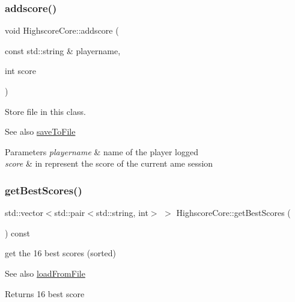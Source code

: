 \subsubsection{\texorpdfstring{addscore()}{addscore()}}
{\footnotesize\ttfamily void Highscore\+Core\+::addscore (\begin{DoxyParamCaption}\item[{const std\+::string \&}]{playername,  }\item[{int}]{score }\end{DoxyParamCaption})\hspace{0.3cm}{\ttfamily [inline]}}



Store file in this class. 

\begin{DoxySeeAlso}{See also}
\hyperlink{class_highscore_core_a7a86c95f26a7b0d527f639f94bf96301}{save\+To\+File} 
\end{DoxySeeAlso}

\begin{DoxyParams}{Parameters}
{\em playername} & name of the player logged \\
\hline
{\em score} & in represent the score of the current ame session \\
\hline
\end{DoxyParams}
\mbox{\label{class_highscore_core_a8d80890801631184899061cdd3e5dcbe}} 
\subsubsection{\texorpdfstring{get\+Best\+Scores()}{getBestScores()}}
{\footnotesize\ttfamily std\+::vector$<$std\+::pair$<$std\+::string, int$>$ $>$ Highscore\+Core\+::get\+Best\+Scores (\begin{DoxyParamCaption}{ }\end{DoxyParamCaption}) const\hspace{0.3cm}{\ttfamily [inline]}}



get the 16 best scores (sorted) 

\begin{DoxySeeAlso}{See also}
\hyperlink{class_highscore_core_a5c0000d4513844f8c37e3b8f6f359219}{load\+From\+File} 
\end{DoxySeeAlso}
\begin{DoxyReturn}{Returns}
16 best score 
\end{DoxyReturn}
\mbox{\label{class_highscore_core_a5c0000d4513844f8c37e3b8f6f359219}} 

